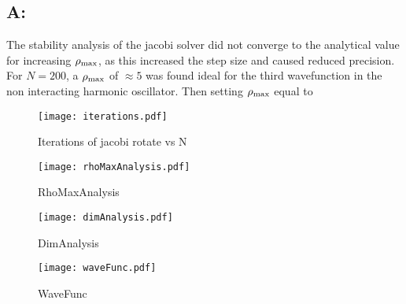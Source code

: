 \subsection*{A:}
\label{sub:a_}

The stability analysis of the jacobi solver did not converge to the
analytical value for increasing $\rho_{\text{max}}$, as this increased the step size
and caused reduced precision. For $N=200$, a $\rho_{\text{max}}$ of $\approx 5$ was
found ideal for the third wavefunction in the non interacting harmonic
oscillator. Then setting $\rho_{\text{max}}$ equal to 


\begin{figure}[htpb]
    \centering
    \texttt{[image: iterations.pdf]}
    \caption{Iterations of jacobi rotate vs N}
    \label{fig:iterations}
\end{figure}

\begin{figure}[htpb]
    \centering
    \texttt{[image: rhoMaxAnalysis.pdf]}
    \caption{RhoMaxAnalysis}
    \label{fig:rhoMaxAnalysis}
\end{figure}

\begin{figure}[htpb]
    \centering
    \texttt{[image: dimAnalysis.pdf]}
    \caption{DimAnalysis}
    \label{fig:dimAnalysis}
\end{figure}

\begin{figure}[htpb]
    \centering
    \texttt{[image: waveFunc.pdf]}
    \caption{WaveFunc }
    \label{fig:waveFunc}
\end{figure}



\begin{equation}
    
\end{equation}
